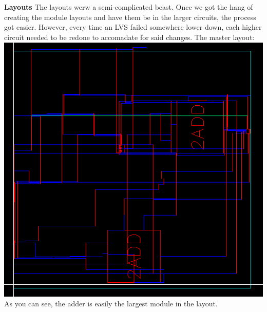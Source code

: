 \documentclass[12pt]{article}
\begin{document}
  \section{}
	
  \textbf{Layouts}
  \newline \newline
  The layouts werw a semi-complicated beast. Once we got the hang of creating the module layouts
  and have them be in the larger circuits, the process got easier. However, every time an LVS failed
  somewhere lower down, each higher circuit needed to be redone to accomadate for said changes.
  \newline \newline
  The master layout:
  \newline \newline
  \includegraphics[scale=0.5]{masterlayout.png} \\
  \newline \newline
  As you can see, the adder is easily the largest module in the layout. 
  \newline \newline
\end{document}
